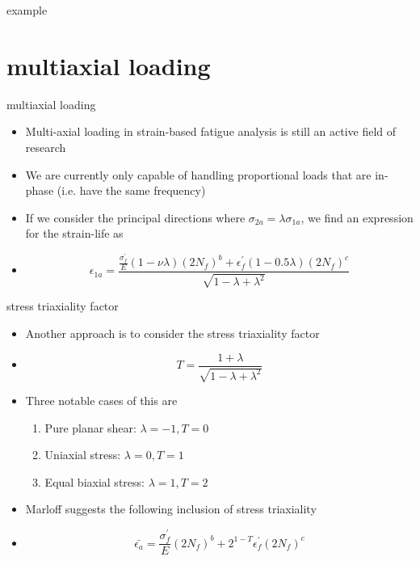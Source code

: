 \documentclass[10pt]{beamer}
\begin{document}
\begin{frame}{example}
	
\end{frame}

\section{multiaxial loading}

\begin{frame}{multiaxial loading}
	\begin{itemize}[<+->]
		\item Multi-axial loading in strain-based fatigue analysis is still an active field of research
		\item We are currently only capable of handling proportional loads that are in-phase (i.e. have the same frequency)
		\item If we consider the principal directions where $\sigma_{2a} = \lambda \sigma_{1a}$, we find an expression for the strain-life as
		\item[] \begin{equation}
		\epsilon_{1a} = \frac{\frac{\sigma_f^\prime}{E}(1-\nu \lambda)(2N_f)^b + \epsilon_f^\prime(1-0.5\lambda)(2N_f)^c}{\sqrt{1-\lambda+\lambda^2}}
		\end{equation}
	\end{itemize}
\end{frame}

\begin{frame}{stress triaxiality factor}
	\begin{itemize}[<+->]
		\item Another approach is to consider the stress triaxiality factor
		\item[] \begin{equation}
		T = \frac{1+\lambda}{\sqrt{1-\lambda+\lambda^2}}
		\end{equation}
		\item Three notable cases of this are
		\begin{enumerate}
			\item Pure planar shear: $\lambda=-1, T=0$
			\item Uniaxial stress: $\lambda=0, T=1$
			\item Equal biaxial stress: $\lambda=1, T=2$
		\end{enumerate}
		\item Marloff suggests the following inclusion of stress triaxiality
		\item[] \begin{equation}
		\bar{\epsilon_a} = \frac{\sigma_f^\prime}{E}(2 N_f)^b + 2^{1-T}\epsilon_f^\prime(2N_f)^c
		\end{equation}
	\end{itemize}
\end{frame}
\end{document}
